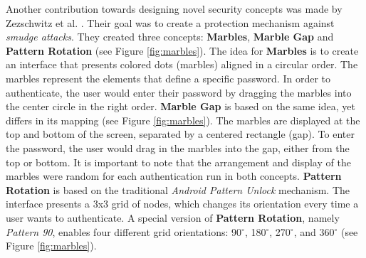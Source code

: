 Another contribution towards designing novel security concepts was made by Zezschwitz et al. \cite{Marbles}. Their goal was to create a protection mechanism against \textit{smudge attacks}. They created three concepts: \textbf{Marbles}, \textbf{Marble Gap} and \textbf{Pattern Rotation} (see Figure \ref{fig:marbles}). The idea for \textbf{Marbles} is to create an interface that presents colored dots (marbles) aligned in a circular order. The marbles represent the elements that define a specific password. In order to authenticate, the user would enter their password by dragging the marbles into the center circle in the right order. \textbf{Marble Gap} is based on the same idea, yet differs in its mapping (see Figure \ref{fig:marbles}). The marbles are displayed at the top and bottom of the screen, separated by a centered rectangle (gap). To enter the password, the user would drag in the marbles into the gap, either from the top or bottom. It is important to note that the arrangement and display of the marbles were random for each authentication run in both concepts. \textbf{Pattern Rotation} is based on the traditional \textit{Android Pattern Unlock} mechanism. The interface presents a 3x3 grid of nodes, which changes its orientation every time a user wants to authenticate. A special version of \textbf{Pattern Rotation}, namely \textit{Pattern 90}, enables four different grid orientations: 90$^\circ$, 180$^\circ$, 270$^\circ$, and 360$^\circ$ (see Figure \ref{fig:marbles}). \\

